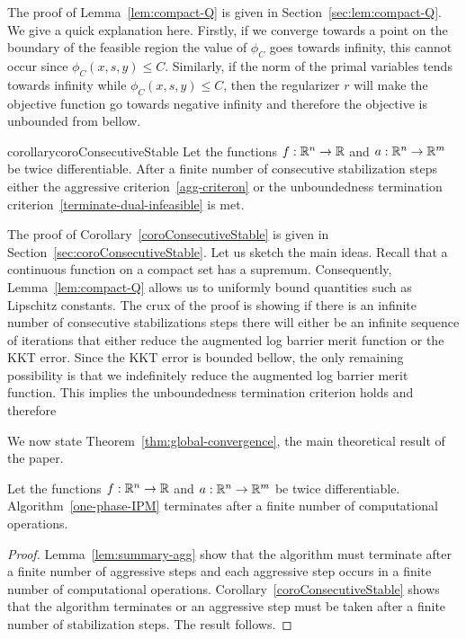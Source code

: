 \documentclass{article}
\begin{document}
The proof of Lemma~\ref{lem:compact-Q} is given in Section~\ref{sec:lem:compact-Q}. We give a quick explanation here. Firstly, if we converge towards a point on the boundary of the feasible region the value of $\phi_{C}$ goes towards infinity, this cannot occur since $\phi_{C}(x, s, y) \le C$. Similarly, if the norm of the primal variables tends towards infinity while $\phi_{C}(x, s, y) \le C$, then the regularizer $r$ will make the objective function go towards negative infinity and therefore the objective is unbounded from bellow.

\begin{restatable}{corollary}{coroConsecutiveStable}\label{coroConsecutiveStable}
Let the functions $f : \mathbb{R}^{n} \rightarrow \mathbb{R}$ and $a : \mathbb{R}^{n} \rightarrow \mathbb{R}^{m}$ be twice differentiable.
After a finite number of consecutive stabilization steps either the aggressive criterion~\eqref{agg-criteron} or the unboundedness termination criterion~\eqref{terminate-dual-infeasible}  is met.
\end{restatable}

The proof of Corollary~\ref{coroConsecutiveStable} is given in Section~\ref{sec:coroConsecutiveStable}. Let us sketch the main ideas. Recall that a continuous function on a compact set has a supremum. Consequently, Lemma~\ref{lem:compact-Q} allows us to uniformly bound quantities such as Lipschitz constants. The crux of the proof is showing if there is an infinite number of consecutive stabilizations steps there will either be an infinite sequence of iterations that either reduce the augmented log barrier merit function or the KKT error. Since the KKT error is bounded bellow, the only remaining possibility is that we indefinitely reduce the augmented log barrier merit function. This implies the unboundedness termination criterion holds and therefore 

We now state Theorem~\ref{thm:global-convergence}, the main theoretical result of the paper.

\begin{theorem}\label{thm:global-convergence}
Let the functions $f : \mathbb{R}^{n} \rightarrow \mathbb{R}$ and $a : \mathbb{R}^{n} \rightarrow \mathbb{R}^{m}$ be twice differentiable.
Algorithm~\ref{one-phase-IPM} terminates after a finite number of computational operations.
\end{theorem}

\begin{proof}
Lemma~\ref{lem:summary-agg} show that the algorithm must terminate after a finite number of aggressive steps and each aggressive step occurs in a finite number of computational operations.
Corollary~\ref{coroConsecutiveStable} shows that the algorithm terminates or an aggressive step must be taken after a finite number of stabilization steps. The result follows.
\end{proof}
\end{document}
